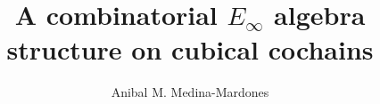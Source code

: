 \documentclass{amsart}
\theoremstyle{definition}
\begin{document}
\title{A combinatorial $E_\infty$ algebra structure on cubical cochains}
\author{Anibal M. Medina-Mardones}
\address{Max Plank Institute for Mathematics, Bonn, Germany}
\address{Department of Mathematics, University of Notre Dame, Notre Dame, IN, USA}


\begin{abstract}
	
\end{abstract} 

\maketitle
\tableofcontents









\end{document}
